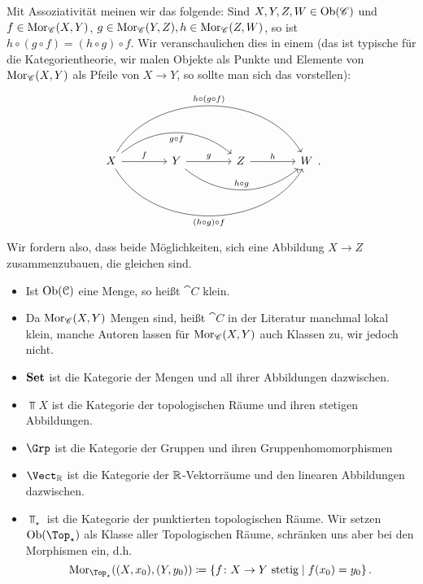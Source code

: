 \begin{remark*}
    Mit Assoziativität meinen wir das folgende: Sind $X,Y,Z,W\in \operatorname{Ob}(\mathscr{C})$ und $f\in \operatorname{Mor}_{\mathscr{C}}(X,Y)$, $g\in \operatorname{Mor}_{\mathscr{C}}(Y,Z), h\in \operatorname{Mor}_{\mathscr{C}}(Z,W)$, so ist $h \circ  (g \circ f) = (h \circ  g) \circ  f$. Wir veranschaulichen dies in einem  (das ist typische für die Kategorientheorie, wir malen Objekte als Punkte und Elemente von $\operatorname{Mor}_{\mathscr{C}}(X,Y)$ als Pfeile von $X\to Y$, so sollte man sich das vorstellen):
    \[
    \begin{tikzcd}[column sep = 4em, row sep = 4em]
        X \ar[bend left = 60]{rrr}{h \circ  (g \circ  f)} \ar[bend right = 60, swap]{rrr}{(h \circ  g) \circ f}\ar[bend left = 40,swap]{rr}{g \circ  f}\ar{r}{f} & Y\ar[bend right = 40]{rr}{h \circ  g} \ar{r}{g} & Z \ar{r}{h} & W
    \end{tikzcd}
    .\] 
    Wir fordern also, dass beide Möglichkeiten, sich eine Abbildung $X\to Z$ zusammenzubauen, die gleichen sind.
\end{remark*}

\begin{remark}
    \begin{itemize}
        \item Ist $\operatorname{Ob}(\mathcal{C})$ eine Menge, so heißt $\cat{C}$ klein.
        \item Da $\operatorname{Mor}_{\mathscr{C}}(X,Y)$ Mengen sind, heißt $\cat{C}$ in der Literatur manchmal lokal klein, manche Autoren lassen für $\operatorname{Mor}_{\mathscr{C}}(X,Y)$ auch Klassen zu, wir jedoch nicht.
    \end{itemize}
\end{remark}

\begin{example}
    \begin{itemize}
        \item $\operatorname{\textbf{Set}}$ ist die Kategorie der Mengen und all ihrer Abbildungen dazwischen.
        \item $\Top X$ ist die Kategorie der topologischen Räume und ihren stetigen Abbildungen.
        \item $\Grp$ ist die Kategorie der Gruppen und ihren Gruppenhomomorphismen
        \item  $\Vect_{\R}$ ist die Kategorie der $\mathbb{R}$-Vektorräume und den linearen Abbildungen dazwischen.
        \item $\Top_{\star}$ ist die Kategorie der punktierten topologischen Räume. Wir setzen $\Ob(\Top_{\star })$ als Klasse aller Topologischen Räume, schränken uns aber bei den Morphismen ein, d.h.
            \[
                \Mor_{\Top_{\star }}((X,x_0),(Y,y_0)) \coloneqq  \left \{f \colon X \to  Y \text{ stetig}\mid  f(x_0) = y_0\right\} 
            .\] 
    \end{itemize}
\end{example}

